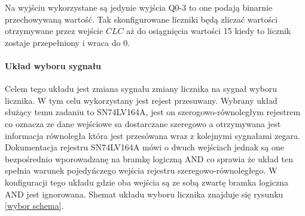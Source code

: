 \documentclass[a4paper,12pt]{article}
\begin{document}
Na wyjściu wykorzystane są jedynie wyjścia Q0-3 to one podają binarnie przechowywaną wartość. 
Tak skonfigurowane liczniki będą zliczać wartości otrzymywane przez wejście $CLC$ aż do osiągnięcia wartości 15 kiedy to licznik zostaje przepełniony i wraca do 0. 

\paragraph{Układ wyboru sygnału}

Celem tego układu jest zmiana sygnału zmiany licznika na sygnał wyboru licznika. W tym celu wykorzystany jest rejest przesuwany. 
Wybrany układ służący temu zadaniu to SN74LV164A\cite{shift doc}, jest on szerogowo-równoległym rejestrem co oznacza ze dane wejściowe sa dostarczane szeregowo a otrzymywana jest informacja równoległa która jest przesówana wraz z kolejnymi sygnałami zegara. Dokumentacja rejestru SN74LV164A mówi o dwuch wejściach jednak są one bezpośrednio wporowadzanę na bramkę logiczną AND co sprawia że układ ten spełnia warunek pojedyńczego wejścia rejestru szeregowo-równoległego. W konfiguracji tego układu gdzie oba wejścia są ze sobą zwartę bramka logiczna AND jest ignorowana.
Shemat układu wyboru licznika znajduje się rysunku \ref{wybor schema}. 
\end{document}
